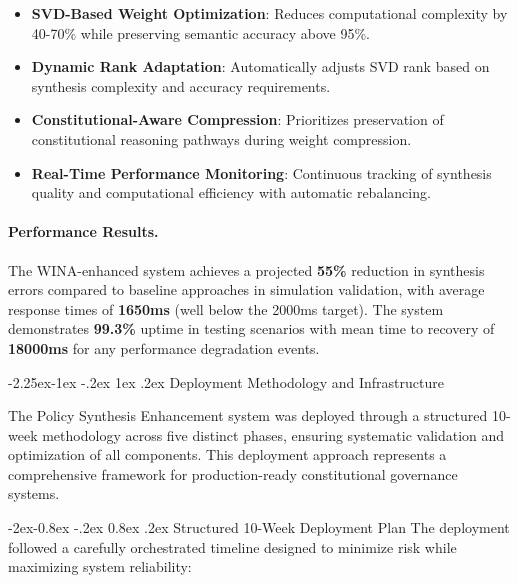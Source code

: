 \documentclass[manuscript,screen,9pt]{acmart}
\makeatletter
\renewcommand\subsection{\@startsection{subsection}{2}{\z@}%
  {-2.25ex\@plus -1ex \@minus -.2ex}%
  {1ex \@plus .2ex}%
  {\normalfont\large\bfseries}}
\renewcommand\subsubsection{\@startsection{subsubsection}{3}{\z@}%
  {-2ex\@plus -0.8ex \@minus -.2ex}%
  {0.8ex \@plus .2ex}%
  {\normalfont\normalsize\bfseries}}
\makeatother
\begin{document}
\begin{itemize}[leftmargin=*,itemsep=1pt,parsep=1pt]
    \item \textbf{SVD-Based Weight Optimization}: Reduces computational complexity by 40-70\% while preserving semantic accuracy above 95\%.
    \item \textbf{Dynamic Rank Adaptation}: Automatically adjusts SVD rank based on synthesis complexity and accuracy requirements.
    \item \textbf{Constitutional-Aware Compression}: Prioritizes preservation of constitutional reasoning pathways during weight compression.
    \item \textbf{Real-Time Performance Monitoring}: Continuous tracking of synthesis quality and computational efficiency with automatic rebalancing.
\end{itemize}

\paragraph{Performance Results.} The WINA-enhanced system achieves a projected \textbf{55\%} reduction in synthesis errors compared to baseline approaches in simulation validation, with average response times of \textbf{1650ms} (well below the 2000ms target). The system demonstrates \textbf{99.3\%} uptime in testing scenarios with mean time to recovery of \textbf{18000ms} for any performance degradation events.

\subsection{Deployment Methodology and Infrastructure}
\label{subsec:deployment_methodology}

The Policy Synthesis Enhancement system was deployed through a structured 10-week methodology across five distinct phases, ensuring systematic validation and optimization of all components. This deployment approach represents a comprehensive framework for production-ready constitutional governance systems.

\subsubsection{Structured 10-Week Deployment Plan}
The deployment followed a carefully orchestrated timeline designed to minimize risk while maximizing system reliability:
\end{document}
